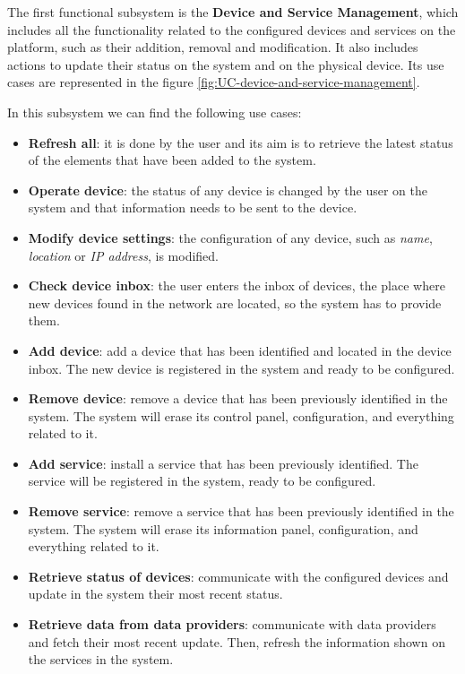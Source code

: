 The first functional subsystem is the \textbf{Device and Service Management}, which includes all the functionality related to the 
configured devices and services on the platform, such as their addition, removal and modification. It also includes actions
to update their status on the system and on the physical device. Its use cases are represented in the figure 
\ref{fig:UC-device-and-service-management}.

In this subsystem we can find the following use cases:
\begin{itemize}
	\item \textbf{Refresh all}: it is done by the user and its aim is to retrieve the latest status of the elements that have been 
	added to the system.
	\item \textbf{Operate device}: the status of any device is changed by the user on the system and that information needs to be
	sent to the device.
	\item \textbf{Modify device settings}: the configuration of any device, such as \textit{name}, \textit{location} or \textit{IP address},
	is modified.
	\item \textbf{Check device inbox}: the user enters the inbox of devices, the place where new devices found in the network are 
	located, so the system has to provide them.
	\item \textbf{Add device}: add a device that has been identified and located in the device inbox. The new device is registered 
	in the system and ready to be configured.
	\item \textbf{Remove device}: remove a device that has been previously identified in the system. The system will erase its
	control panel, configuration, and everything related to it.
	\item \textbf{Add service}: install a service that has been previously identified. The service will be registered in the system,
	ready to be configured.
	\item \textbf{Remove service}: remove a service that has been previously identified in the system. The system will erase its
	information panel, configuration, and everything related to it.
	\item \textbf{Retrieve status of devices}: communicate with the configured devices and update in the system their most recent
	status.
	\item \textbf{Retrieve data from data providers}: communicate with data providers and fetch their most recent update. Then, 
	refresh the information shown on the services in the system.

\end{itemize}

